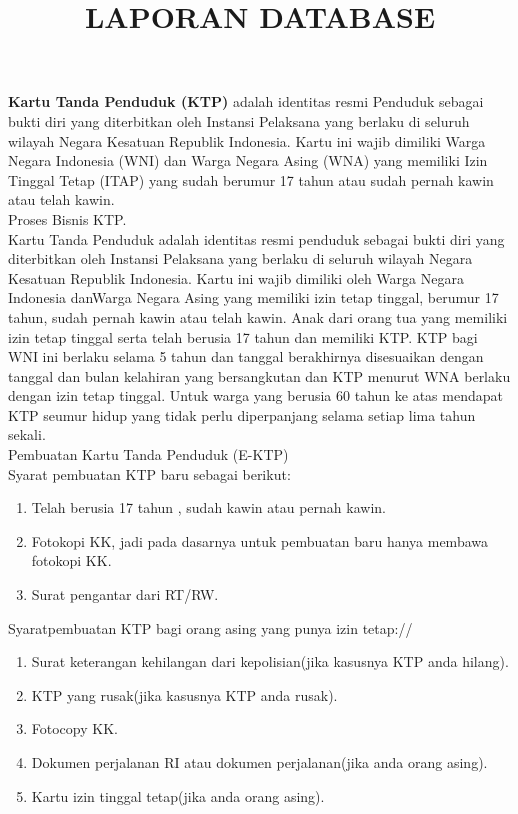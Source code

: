\documentclass[12pt,a4paper,bahasa]{article}
\begin{document}
\title{LAPORAN DATABASE}   
\maketitle

\textbf{Kartu Tanda Penduduk (KTP) } adalah identitas resmi Penduduk sebagai bukti diri yang diterbitkan oleh Instansi Pelaksana yang berlaku di seluruh wilayah Negara Kesatuan Republik Indonesia. Kartu ini wajib dimiliki Warga Negara Indonesia (WNI) dan Warga Negara Asing (WNA) yang memiliki Izin Tinggal Tetap (ITAP) yang sudah berumur 17 tahun atau sudah pernah kawin atau telah kawin. \\

Proses Bisnis KTP.\\

Kartu Tanda Penduduk adalah identitas resmi penduduk sebagai bukti diri yang diterbitkan oleh Instansi Pelaksana yang berlaku di seluruh wilayah Negara Kesatuan Republik Indonesia. Kartu ini wajib dimiliki oleh Warga Negara Indonesia danWarga Negara Asing yang memiliki izin tetap tinggal, berumur 17 tahun, sudah pernah kawin atau telah kawin. Anak dari orang tua yang memiliki izin tetap tinggal serta telah berusia 17 tahun dan memiliki KTP.  KTP bagi WNI ini berlaku selama 5   tahun dan tanggal berakhirnya disesuaikan dengan tanggal dan bulan kelahiran yang bersangkutan dan KTP menurut WNA berlaku dengan izin tetap tinggal. Untuk warga yang berusia 60 tahun ke atas mendapat KTP seumur hidup yang tidak perlu diperpanjang selama setiap lima tahun sekali.\\

Pembuatan Kartu Tanda Penduduk (E-KTP)\\

       Syarat pembuatan KTP baru sebagai berikut:\\
       \begin{enumerate}
       \item Telah berusia 17 tahun , sudah kawin atau pernah kawin.
       \item Fotokopi KK, jadi pada dasarnya untuk pembuatan baru hanya membawa fotokopi KK.
       \item Surat pengantar dari RT/RW. 
       \end{enumerate}

Syaratpembuatan KTP bagi orang asing yang punya izin tetap://
	\begin{enumerate}
	\item Surat keterangan kehilangan dari kepolisian(jika 		   kasusnya KTP anda hilang).
	\item KTP yang rusak(jika kasusnya KTP anda rusak).
	\item Fotocopy KK.
	\item Dokumen perjalanan RI atau dokumen perjalanan(jika anda orang asing).
	\item Kartu izin tinggal tetap(jika anda orang asing).
	\end{enumerate}
	
\end{document}
